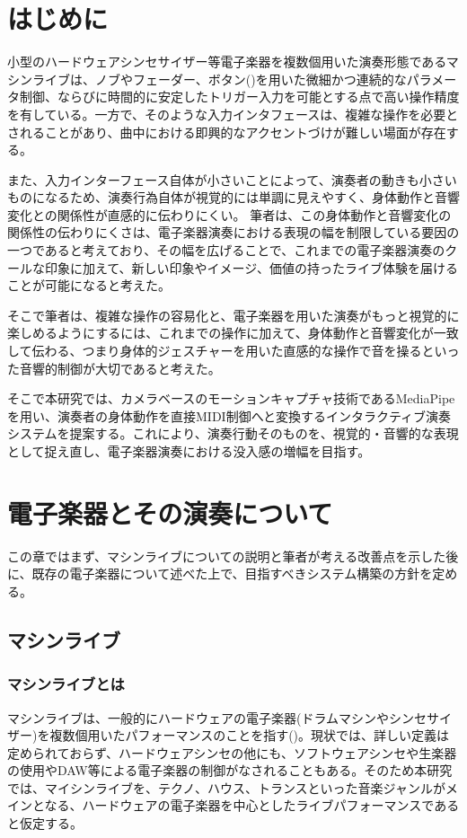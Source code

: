 \section{はじめに}

小型のハードウェアシンセサイザー等電子楽器を複数個用いた演奏形態であるマシンライブは、ノブやフェーダー、ボタン()を用いた微細かつ連続的なパラメータ制御、ならびに時間的に安定したトリガー入力を可能とする点で高い操作精度を有している。一方で、そのような入力インタフェースは、複雑な操作を必要とされることがあり、曲中における即興的なアクセントづけが難しい場面が存在する。

また、入力インターフェース自体が小さいことによって、演奏者の動きも小さいものになるため、演奏行為自体が視覚的には単調に見えやすく、身体動作と音響変化との関係性が直感的に伝わりにくい。
筆者は、この身体動作と音響変化の関係性の伝わりにくさは、電子楽器演奏における表現の幅を制限している要因の一つであると考えており、その幅を広げることで、これまでの電子楽器演奏のクールな印象に加えて、新しい印象やイメージ、価値の持ったライブ体験を届けることが可能になると考えた。

そこで筆者は、複雑な操作の容易化と、電子楽器を用いた演奏がもっと視覚的に楽しめるようにするには、これまでの操作に加えて、身体動作と音響変化が一致して伝わる、つまり身体的ジェスチャーを用いた直感的な操作で音を操るといった音響的制御が大切であると考えた。

そこで本研究では、カメラベースのモーションキャプチャ技術であるMediaPipe\cite{MediaPipe}を用い、演奏者の身体動作を直接MIDI制御へと変換するインタラクティブ演奏システムを提案する。これにより、演奏行動そのものを、視覚的・音響的な表現として捉え直し、電子楽器演奏における没入感の増幅を目指す。



\section{電子楽器とその演奏について}

この章ではまず、マシンライブについての説明と筆者が考える改善点を示した後に、既存の電子楽器について述べた上で、目指すべきシステム構築の方針を定める。

\subsection{マシンライブ}
\subsubsection{マシンライブとは}
マシンライブは、一般的にハードウェアの電子楽器(ドラムマシンやシンセサイザー)を複数個用いたパフォーマンスのことを指す()。現状では、詳しい定義は定められておらず、ハードウェアシンセの他にも、ソフトウェアシンセや生楽器の使用やDAW等による電子楽器の制御がなされることもある。そのため本研究では、マイシンライブを、テクノ、ハウス、トランスといった音楽ジャンルがメインとなる、ハードウェアの電子楽器を中心としたライブパフォーマンスであると仮定する。

